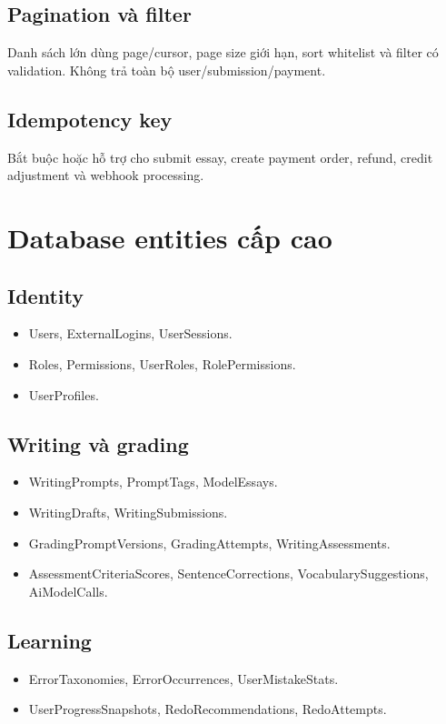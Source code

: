 \documentclass[11pt,a4paper]{article}
\begin{document}
\subsection{Pagination và filter}
Danh sách lớn dùng page/cursor, page size giới hạn, sort whitelist và filter có validation. Không trả toàn bộ user/submission/payment.

\subsection{Idempotency key}
Bắt buộc hoặc hỗ trợ cho submit essay, create payment order, refund, credit adjustment và webhook processing.

\section{Database entities cấp cao}

\subsection{Identity}
\begin{itemize}
  \item Users, ExternalLogins, UserSessions.
  \item Roles, Permissions, UserRoles, RolePermissions.
  \item UserProfiles.
\end{itemize}

\subsection{Writing và grading}
\begin{itemize}
  \item WritingPrompts, PromptTags, ModelEssays.
  \item WritingDrafts, WritingSubmissions.
  \item GradingPromptVersions, GradingAttempts, WritingAssessments.
  \item AssessmentCriteriaScores, SentenceCorrections, VocabularySuggestions, AiModelCalls.
\end{itemize}

\subsection{Learning}
\begin{itemize}
  \item ErrorTaxonomies, ErrorOccurrences, UserMistakeStats.
  \item UserProgressSnapshots, RedoRecommendations, RedoAttempts.
\end{itemize}
\end{document}
